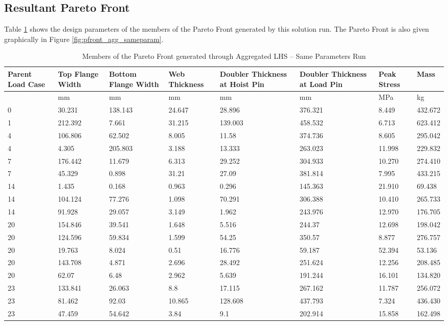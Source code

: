 \subsection{Resultant Pareto Front}
Table \ref{tab:pfront_agg_sameparam} shows the design parameters of the members of the Pareto Front generated by this solution run. The Pareto Front is also given graphically in Figure \ref{fig:pfront_agg_sameparam}. 
\begin{table}[!htbp]
\small
\begin{tabular}{|p{1.5cm}p{1.5cm}p{1.5cm}p{1.4cm}p{2cm}p{2cm}p{1.5cm}p{1.5cm}|}
\hline
Parent Load Case&Top Flange Width&Bottom Flange Width&Web Thickness&Doubler Thickness at Hoist Pin&Doubler Thickness at Load Pin&Peak Stress& Mass\\
\hline
&mm&mm&mm&mm&mm&MPa&kg\\
\hline
0&30.231&138.143&24.647&28.896&376.321&8.449&432.672\\
1&212.392&7.661&31.215&139.003&458.532&6.713&623.412\\
4&106.806&62.502&8.005&11.58&374.736&8.605&295.042\\
4&4.305&205.803&3.188&13.333&263.023&11.998&229.832\\
7&176.442&11.679&6.313&29.252&304.933&10.270&274.410\\
7&45.329&0.898&31.21&27.09&381.814&7.995&433.215\\
14&1.435&0.168&0.963&0.296&145.363&21.910&69.438\\
14&104.124&77.276&1.098&70.291&306.388&10.410&265.733\\
14&91.928&29.057&3.149&1.962&243.976&12.970&176.705\\
20&154.846&39.541&1.648&5.516&244.37&12.698&198.042\\
20&124.596&59.834&1.599&54.25&350.57&8.877&276.757\\
20&19.763&8.024&0.51&16.776&59.187&52.394&53.136\\
20&143.708&4.871&2.696&28.492&251.624&12.256&208.485\\
20&62.07&6.48&2.962&5.639&191.244&16.101&134.820\\
23&133.841&26.063&8.8&17.115&267.162&11.787&256.072\\
23&81.462&92.03&10.865&128.608&437.793&7.324&436.430\\
23&47.459&54.642&3.84&9.1&202.914&15.858&162.498\\
\hline
\end{tabular}
\caption{Members of the Pareto Front generated through Aggregated LHS -- Same Parameters Run}
\label{tab:pfront_agg_sameparam}
\end{table}

